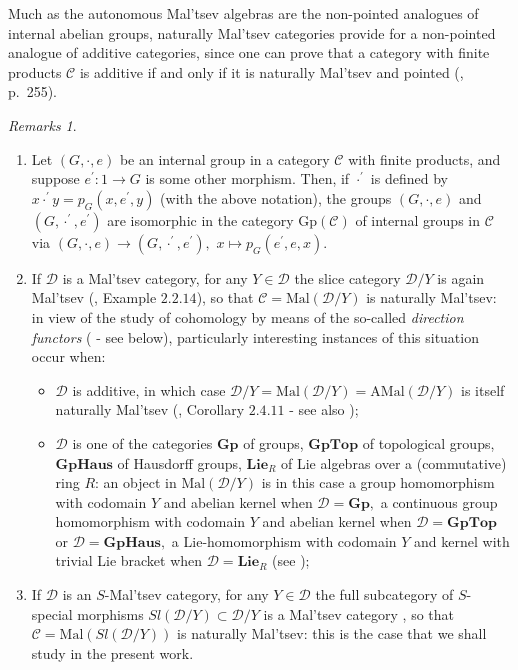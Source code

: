 \documentclass[11pt]{amsart}
\theoremstyle{plain}
\theoremstyle{definition}
\theoremstyle{remark}
\newtheorem{remarks}[subsubsection]{Remarks}
\begin{document}
Much as the autonomous Mal'tsev algebras are the non-pointed analogues of internal abelian groups, naturally Mal'tsev categories provide for a non-pointed analogue of additive categories, since one can prove that a category with finite products $\mathcal{C}$ is additive if and only if it is naturally Mal'tsev and pointed (\cite{johnstone}, p.~255).
\begin{remarks}
\label{ex:naturally_maltsev}
\begin{enumerate}
\item Let $(G,\cdot,e)$ be an internal group in a category $\mathcal{C}$ with finite products, and suppose $e^\prime\colon1\rightarrow G$ is some other morphism. Then, if $\cdot^\prime$ is defined by $x\cdot^\prime y=p_G(x,e^\prime,y)$ (with the above notation), the groups $(G,\cdot,e)$ and $(G,\cdot^\prime,e^\prime)$ are isomorphic in the category $\mathrm{Gp}(\mathcal{C})$ of internal groups in $\mathcal{C}$ via $(G,\cdot,e)\rightarrow(G,\cdot^\prime,e^\prime),$ $x\mapsto p_G(e^\prime,e,x).$

\item If $\mathcal{D}$ is a Mal'tsev category, for any $Y\in\mathcal{D}$ the slice category $\mathcal{D}/Y$ is again Mal'tsev (\cite{borceux-bourn}, Example $2.2.14$), so that $\mathcal{C}=\mathrm{Mal}(\mathcal{D}/Y)$ is naturally Mal'tsev: in view of the study of cohomology by means of the so-called \emph{direction functors} (\cite{baer-sums, bourn-rodelo} - see below), particularly interesting instances of this situation occur when:
\begin{itemize}
\item $\mathcal{D}$ is additive, in which case $\mathcal{D}/Y=\mathrm{Mal}(\mathcal{D}/Y)=\mathrm{AMal}(\mathcal{D}/Y)$ is itself naturally Mal'tsev (\cite{borceux-bourn}, Corollary $2.4.11$ - see also \cite{bourn-rodelo});
\item $\mathcal{D}$ is one of the categories $\mathbf{Gp}$ of groups, $\mathbf{GpTop}$ of topological groups, $\mathbf{GpHaus}$ of Hausdorff groups, $\mathbf{Lie}_R$ of Lie algebras over a (commutative) ring $R$: an object in $\mathrm{Mal}(\mathcal{D}/Y)$ is in this case a group homomorphism with codomain $Y$ and abelian kernel when $\mathcal{D}=\mathbf{Gp},$ a continuous group homomorphism with codomain $Y$ and abelian kernel when $\mathcal{D}=\mathbf{GpTop}$ or $\mathcal{D}=\mathbf{GpHaus},$ a Lie-homomorphism with codomain $Y$ and kernel with trivial Lie bracket when $\mathcal{D}=\mathbf{Lie}_R$ (see \cite{bourn-rodelo});
\end{itemize}
\item If $\mathcal{D}$ is an $S$-Mal'tsev category, for any $Y\in\mathcal{D}$ the full subcategory of $S$-special morphisms $Sl(\mathcal{D}/Y)\subset \mathcal{D}/Y$ is a Mal'tsev category \cite{schreier_book, S-protomodular}, so that $\mathcal{C}=\mathrm{Mal}(Sl(\mathcal{D}/Y))$ is naturally Mal'tsev: this is the case that we shall study in the present work.
\end{enumerate}
\end{remarks}
\end{document}
